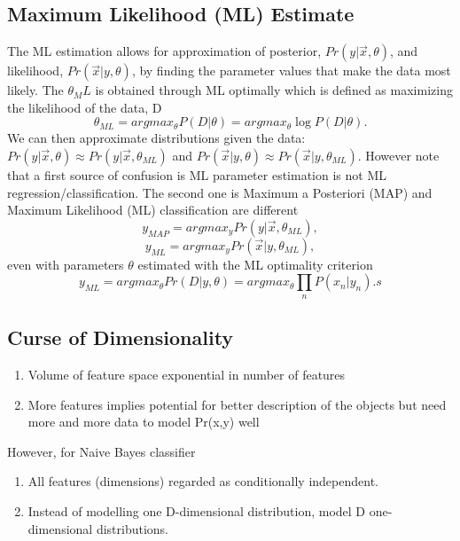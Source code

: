 \documentclass[12pt]{article}
\numberwithin{equation}{section}
\begin{document}
\subsection{Maximum Likelihood (ML) Estimate}
The ML estimation allows for approximation of posterior, $Pr(y|\vec{x},\theta)$, and likelihood, $Pr(\vec{x}|y,\theta)$, by finding the parameter values that make the data most likely. The $\theta_ML$ is obtained through ML optimally which is defined as maximizing the likelihood of the data, D 
\begin{equation}
\theta_{ML} = arg max_\theta P(D | \theta) = arg max_\theta \log P(D | \theta).
\end{equation}
We can then approximate distributions given the data: $Pr(y|\vec{x},\theta) \approx Pr(y|\vec{x},\theta_{ML})$ and $Pr(\vec{x}|y,\theta)\approx Pr(\vec{x}|y,\theta_{ML})$. However note that a first source of confusion is ML parameter estimation is not ML regression/classification. The second one is Maximum a Posteriori (MAP) and Maximum Likelihood (ML) classification are different 
\begin{equation}
y_{MAP} = arg max_y Pr(y|\vec{x},\theta_{ML}),
\end{equation}
\begin{equation}
y_{ML} = arg max_y Pr(\vec{x}|y,\theta_{ML}),
\end{equation}
even with parameters $\theta$ estimated with the ML optimality criterion 
\begin{equation}
y_{ML} = arg max_\theta Pr(D|y,\theta) = arg max_\theta \prod_n P(x_n|y_n).s
\end{equation}

\subsection{Curse of Dimensionality}
\begin{enumerate}
\item Volume of feature space exponential in number of features
\item More features implies potential for better description of the objects but need more and more data to model Pr(x,y) well
\end{enumerate}
However, for Naive Bayes classifier
\begin{enumerate}
\item All features (dimensions) regarded as conditionally independent.
\item Instead of modelling one D-dimensional distribution, model D one-dimensional distributions.
\end{enumerate}
\end{document}
